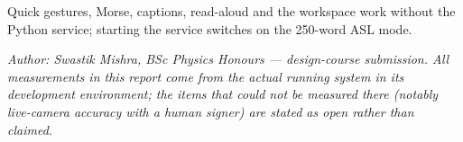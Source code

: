 \documentclass[11pt,a4paper]{article}
\begin{document}
Quick gestures, Morse, captions, read-aloud and the workspace work without the Python service; starting the service switches on the 250-word ASL mode.

\vspace{8mm}
\begin{center}
\begin{minipage}{0.85\textwidth}
\itshape\small\color{abmuted}
Author: Swastik Mishra, BSc Physics Honours --- design-course submission. All measurements in this report come from the actual running system in its development environment; the items that could not be measured there (notably live-camera accuracy with a human signer) are stated as open rather than claimed.
\end{minipage}
\end{center}
\end{document}
